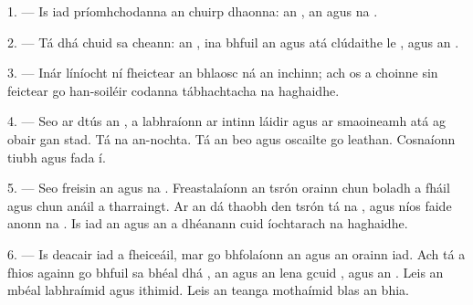 %

\VUsaut{4.0mm}
\VUsaut{2.0mm}

\VUsaut{2.4mm}
\VUsaut{3.0mm}

1. --- Is iad príomhchodanna an chuirp dhaonna: an , an
 agus na .

\VUsaut{3.0mm}

2. --- Tá dhá chuid sa cheann: an , ina bhfuil an
 agus atá clúdaithe le , agus an
.

3. --- Inár líníocht ní fheictear an bhlaosc ná an inchinn; ach os a choinne sin
feictear go han-soiléir codanna tábhachtacha na haghaidhe.

4. --- Seo ar dtús an , a labhraíonn ar intinn láidir agus ar
smaoineamh atá ag obair gan stad. Tá na  an-nochta. Tá an
 beo agus oscailte go leathan. Cosnaíonn  tiubh agus
 fada í.

5. --- Seo freisin an  agus na . Freastalaíonn an
tsrón orainn chun boladh a fháil agus chun anáil a tharraingt. Ar an dá thaobh den
tsrón tá na , agus níos faide anonn na . Is iad an
 agus an  a dhéanann cuid íochtarach na haghaidhe.

6. --- Is deacair iad a fheiceáil, mar go bhfolaíonn an  agus an
 orainn iad. Ach tá a fhios againn go bhfuil sa bhéal dhá
, an  agus an 
lena gcuid , agus an . Leis an mbéal labhraímid agus
ithimid. Leis an teanga mothaímid blas an bhia.

